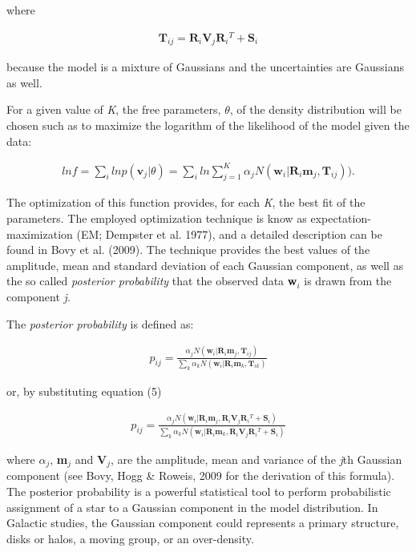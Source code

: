 \documentclass[apj]{emulateapj}
\begin{document}
where

\begin{eqnarray}
\textbf{T$_{ij}$} = \textbf{R$_{i}$}\textbf{V$_{j}$}\textbf{R$_{i}$$^{T}$} + \textbf{S$_{i}$}
\end{eqnarray}

because the model is a mixture of Gaussians and the uncertainties are Gaussians as well.

For a given value of \emph{K}, the free parameters, $\theta$, of the density distribution will be chosen such as to maximize the logarithm of the likelihood of the model given the data:

\begin{eqnarray}
ln f = \sum_{i}ln p(\textbf{v$_{j}$}|\theta) = \sum_{i}ln\sum_{j=1}^K \alpha_{j}N(\textbf{w$_{i}$|R$_{i}$m$_{j}$},\textbf{T$_{ij}$})).
\end{eqnarray}

The optimization of this function provides, for each \emph{K}, the best fit of the parameters.
The employed optimization technique is know as expectation-maximization (EM; Dempster et al. 1977), and a detailed description can be found in Bovy et al. (2009). The technique provides the best values of the amplitude, mean and standard deviation of each Gaussian component, as well as the so called {\it posterior probability} that the observed data \textbf{w$_{i}$} is drawn from the component \emph{j}.

The {\it posterior probability} is defined as:

\begin{eqnarray}
p_{ij} = \frac{\alpha_{j}N(\textbf{w$_{i}$|R$_{i}$m$_{j}$},\textbf{T$_{ij}$})}{\sum_{k}\alpha_{k}N(\textbf{w$_{i}$|R$_{i}$m$_{k}$},\textbf{T$_{ik}$})}
\end{eqnarray}

or, by substituting equation (5)

\begin{eqnarray}
p_{ij} = \frac{\alpha_{j}N(\textbf{w$_{i}$|R$_{i}$m$_{j}$},\textbf{R$_{i}$}\textbf{V$_{j}$}\textbf{R$_{i}$$^{T}$} + \textbf{S$_{i}$})}{\sum_{k}\alpha_{k}N(\textbf{w$_{i}$|R$_{i}$m$_{k}$},\textbf{R$_{i}$}\textbf{V$_{j}$}\textbf{R$_{i}$$^{T}$} + \textbf{S$_{i}$})}
\end{eqnarray}

where $\alpha_{j}$, \textbf{m$_{j}$} and \textbf{V$_{j}$}, are the amplitude, mean and variance of the \emph{j}th Gaussian component (see Bovy, Hogg \& Roweis, 2009 for the derivation of this formula).
The posterior probability is a powerful statistical tool to perform probabilistic assignment of a star to a Gaussian component in the model distribution. In Galactic studies, the Gaussian component could represents a primary structure, disks or halos, a moving group, or an over-density.\\
\end{document}
